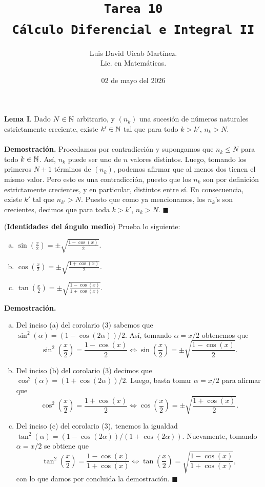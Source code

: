 \documentclass[11pt]{scrartcl}
\title{\texttt{Tarea 10
\\ Cálculo Diferencial e Integral II}}
\author{Luis David Uicab Martínez. 
\\Lic. en Matemáticas.}
\date{02 de mayo del 2026}
\begin{document}
\maketitle
\textbf{Lema I}. Dado $N\in \mathbb N$ arbitrario, y $(n_k)$ una sucesión de números naturales
estrictamente creciente, existe $k' \in \mathbb N$ tal que para todo $k > k'$, $n_k > N$. \\ \\
\textbf{Demostración.} Procedamos por contradicción
y supongamos que $n_{k}\leq N$ para todo $k\in \mathbb N$. Así, $n_k$ puede ser uno de $n$ valores distintos. Luego, tomando los primeros $N+1$ términos de $(n_k)$,
podemos afirmar que al menos dos tienen el mismo valor. Pero esto es una contradicción, puesto que los $n_k$ son por definición estrictamente
crecientes, y en particular, distintos entre sí. En consecuencia, existe $k'$ tal que $n_{k'}>N$. Puesto que como ya mencionamos, los $n_k$'s son crecientes,
decimos que para toda $k > k'$, $n_k > N$. $\blacksquare$
\begin{mdframed}[style=mdpurplebox, frametitle={Ejercicio 01, Tarea 10, Cálculo II}]
    (\textbf{Identidades del ángulo medio}) Prueba lo siguiente:
    \begin{enumerate}[(a)]
        \item  $\sin\left(\frac{x}{2}\right)=\pm\sqrt{\frac{1-\cos\left(x\right)}{2}}.$
        \item  $\cos\left(\frac{x}{2}\right)=\pm\sqrt{\frac{1+\cos\left(x\right)}{2}}.$
        \item  $\tan\left(\frac{x}{2}\right)=\pm\sqrt{\frac{1-\cos\left(x\right)}{1+\cos\left(x\right)}}.$
    \end{enumerate}
\end{mdframed}
\textbf{Demostración.}
\begin{enumerate}[(a)]
    \item Del inciso (a) del corolario (3) sabemos que $\sin^2(\alpha)=\left(1-\cos(2\alpha)\right)/2$. Así,
    tomando $\alpha=x/2$ obtenemos que
    \[
    \sin^2\left(\frac{x}{2}\right)=\frac{1-\cos(x)}{2} \iff \sin\left(\frac{x}{2}\right)=\pm \sqrt{\frac{1-\cos(x)}{2}}.
    \]
    \item Del inciso (b) del corolario (3) decimos que $\cos^2(\alpha)=\left(1+\cos(2\alpha)\right)/2$. Luego,
    basta tomar $\alpha=x/2$ para afirmar que
    \[
    \cos^2\left(\frac{x}{2}\right)=\frac{1+\cos(x)}{2} \iff \cos\left(\frac{x}{2}\right)=\pm \sqrt{\frac{1+\cos(x)}{2}}.
    \]
    \item Del inciso (c) del corolario (3), tenemos la igualdad $\tan^2(\alpha)=\left(1-\cos(2\alpha)\right)/\left(1+\cos(2\alpha)\right)$.
    Nuevamente, tomando $\alpha=x/2$ se obtiene que
    \[
    \tan^2\left(\frac{x}{2}\right)=\frac{1-\cos(x)}{1+\cos(x)} \iff \tan\left(\frac{x}{2}\right)=\sqrt{\frac{1-\cos(x)}{1+\cos(x)}},
    \]
    con lo que damos por concluida la demostración. $\blacksquare$    
\end{enumerate}
\end{document}
